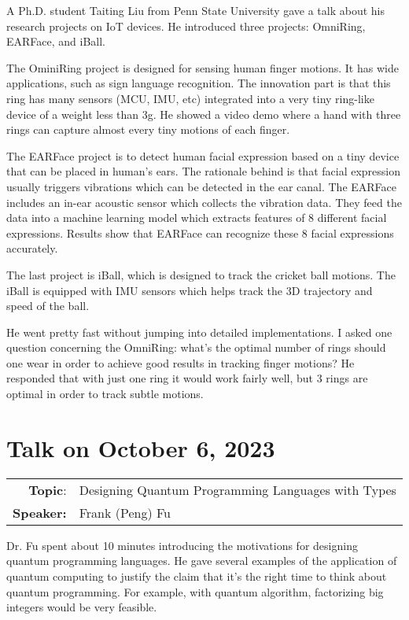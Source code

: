 \documentclass[11pt, oneside]{article}   	%
\begin{document}
A Ph.D. student Taiting Liu from Penn State University gave a talk about his research projects on IoT devices. He introduced three projects: OmniRing, EARFace, and iBall.

The OminiRing project is designed for sensing human finger motions. It has wide applications, such as sign language recognition. The innovation part is that this ring has many sensors (MCU, IMU, etc) integrated into a very tiny ring-like device of a weight less than 3g. He showed a video demo where a hand with three rings can capture almost every tiny motions of each finger.

The EARFace project is to detect human facial expression based on a tiny device that can be placed in human's ears. The rationale behind is that facial expression usually triggers vibrations which can be detected in the ear canal. The EARFace includes an in-ear acoustic sensor which collects the vibration data. They feed the data into a machine learning model which extracts features of 8 different facial expressions. Results show that EARFace can recognize these 8 facial expressions accurately.

The last project is iBall, which is designed to track the cricket ball motions. The iBall is equipped with IMU sensors which helps track the 3D trajectory and speed of the ball.

He went pretty fast without jumping into detailed implementations. I asked one question concerning the OmniRing: what's the optimal number of rings should one wear in order to achieve good results in tracking finger motions? He responded that with just one ring it would work fairly well, but 3 rings are optimal in order to track subtle motions.


\newpage
\section{Talk on October 6, 2023}
\begin{tabularx} {\textwidth}{r X}
\textbf{Topic}: & Designing Quantum Programming Languages with Types \\
\textbf{Speaker:} & Frank (Peng) Fu\\
\end{tabularx}

Dr. Fu spent about 10 minutes introducing the motivations for designing quantum programming languages. He gave several examples of the application of quantum computing to justify the claim that it's the right time to think about quantum programming. For example, with quantum algorithm, factorizing big integers would be very feasible. 
\end{document}
